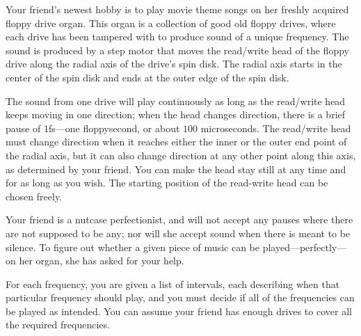 
Your friend's newest hobby is to play movie theme songs on her freshly
acquired floppy drive organ. This organ is a collection of good old
floppy drives, where each drive has been tampered with to produce sound
of a unique frequency. The sound is produced by a step motor that moves
the read/write head of the floppy drive along the radial axis of the drive’s spin disk. The radial
axis starts in the center of the spin disk and ends at the outer edge of the spin disk.

The sound from one drive will
play continuously as long as the read/write head keeps moving in one
direction; when the head changes direction, there is a brief pause of 
$1$fs---one floppysecond, or about $100$ microseconds. The
read/write head must change direction when it reaches either the inner
or the outer end point of the radial axis, but it can also change
direction at any other point along this axis, as determined by your
friend. You can make the head stay still at any time and for as long as you wish.
The starting position of the read-write head can be chosen freely.

Your friend is a nutcase perfectionist, and will not accept any pauses
where there are not supposed to be any; nor will she accept sound when
there is meant to be silence. To figure out whether a given piece of
music can be played---perfectly---on her organ, she has asked for
your help.

For each frequency, you are given a list of intervals, each
describing when that particular frequency should play, and you must decide
if all of the frequencies can be played as intended. You can assume your
friend has enough drives to cover all the required frequencies.

